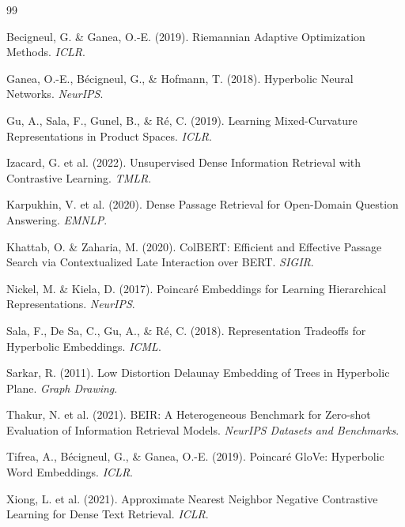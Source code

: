 \documentclass{article}
\begin{document}

\begin{thebibliography}{99}

Becigneul, G. \& Ganea, O.-E. (2019). Riemannian Adaptive Optimization Methods. \textit{ICLR}.

Ganea, O.-E., B\'ecigneul, G., \& Hofmann, T. (2018). Hyperbolic Neural Networks. \textit{NeurIPS}.

Gu, A., Sala, F., Gunel, B., \& R\'e, C. (2019). Learning Mixed-Curvature Representations in Product Spaces. \textit{ICLR}.

Izacard, G. et al. (2022). Unsupervised Dense Information Retrieval with Contrastive Learning. \textit{TMLR}.

Karpukhin, V. et al. (2020). Dense Passage Retrieval for Open-Domain Question Answering. \textit{EMNLP}.

Khattab, O. \& Zaharia, M. (2020). ColBERT: Efficient and Effective Passage Search via Contextualized Late Interaction over BERT. \textit{SIGIR}.

Nickel, M. \& Kiela, D. (2017). Poincar\'e Embeddings for Learning Hierarchical Representations. \textit{NeurIPS}.

Sala, F., De Sa, C., Gu, A., \& R\'e, C. (2018). Representation Tradeoffs for Hyperbolic Embeddings. \textit{ICML}.

Sarkar, R. (2011). Low Distortion Delaunay Embedding of Trees in Hyperbolic Plane. \textit{Graph Drawing}.

Thakur, N. et al. (2021). BEIR: A Heterogeneous Benchmark for Zero-shot Evaluation of Information Retrieval Models. \textit{NeurIPS Datasets and Benchmarks}.

Tifrea, A., B\'ecigneul, G., \& Ganea, O.-E. (2019). Poincar\'e GloVe: Hyperbolic Word Embeddings. \textit{ICLR}.

Xiong, L. et al. (2021). Approximate Nearest Neighbor Negative Contrastive Learning for Dense Text Retrieval. \textit{ICLR}.

\end{thebibliography}
\end{document}
